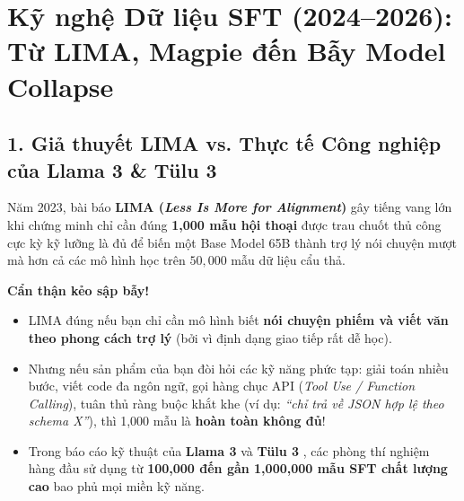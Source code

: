 \section{Kỹ nghệ Dữ liệu SFT (2024--2026): Từ LIMA, Magpie đến Bẫy Model Collapse}
\label{sec:data_engineering_sft}

\subsection{1. Giả thuyết LIMA \citep{zhou2023lima} vs. Thực tế Công nghiệp của Llama 3 \& Tülu 3 \citep{dubey2024llama, lambert2024tulu}}
Năm 2023, bài báo \textbf{LIMA (\textit{Less Is More for Alignment})} \citep{zhou2023lima} gây tiếng vang lớn khi chứng minh chỉ cần đúng \textbf{1,000 mẫu hội thoại} được trau chuốt thủ công cực kỳ kỹ lưỡng là đủ để biến một Base Model 65B thành trợ lý nói chuyện mượt mà hơn cả các mô hình học trên $50,000$ mẫu dữ liệu cẩu thả.

\begin{debate}
\textbf{Cẩn thận kẻo sập bẫy!}
\begin{itemize}[leftmargin=1.2cm]
    \item LIMA đúng nếu bạn chỉ cần mô hình biết \textbf{nói chuyện phiếm và viết văn theo phong cách trợ lý} (bởi vì định dạng giao tiếp rất dễ học).
    \item Nhưng nếu sản phẩm của bạn đòi hỏi các kỹ năng phức tạp: giải toán nhiều bước, viết code đa ngôn ngữ, gọi hàng chục API (\textit{Tool Use / Function Calling}), tuân thủ ràng buộc khắt khe (ví dụ: \textit{``chỉ trả về JSON hợp lệ theo schema X''}), thì 1,000 mẫu là \textbf{hoàn toàn không đủ}!
    \item Trong báo cáo kỹ thuật của \textbf{Llama 3} \citep{dubey2024llama} và \textbf{Tülu 3} \citep{lambert2024tulu}, các phòng thí nghiệm hàng đầu sử dụng từ \textbf{100,000 đến gần 1,000,000 mẫu SFT chất lượng cao} bao phủ mọi miền kỹ năng.
\end{itemize}
\end{debate}

